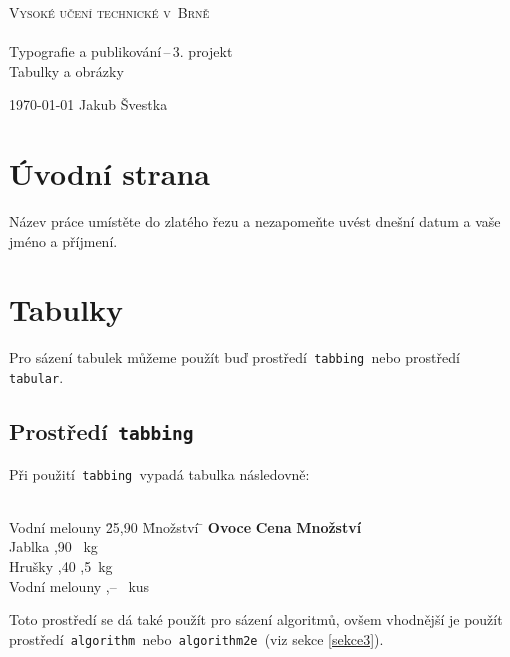 \documentclass[a4paper,11pt]{article}
\begin{document}
\begin{titlepage}
\begin{center}
\fontsize{27.1}{20}\selectfont\textsc{{Vysoké učení technické v~Brně}}\\
\fontsize{22.7}{0}\textsc{\selectfont{Fakulta informačních technologií}}\\
\LARGE{Typografie a publikování\,--\,3. projekt}\\
\Huge{Tabulky a obrázky}
\end{center}

{\hspace*{-0.6cm}\Large \today \hfill
Jakub Švestka}

\end{titlepage}

\newpage
\pagestyle{plain}

\section{Úvodní strana}
Název práce umístěte do zlatého řezu a nezapomeňte uvést dnešní datum a vaše jméno a příjmení.

\section{Tabulky}
Pro sázení tabulek můžeme použít buď prostředí\texttt{ tabbing }nebo prostředí\texttt{ tabular}.

\subsection{Prostředí\texttt{ tabbing}}
Při použití\texttt{ tabbing }vypadá tabulka následovně:
\begin{tabbing}\\[-0.55cm]

Vodní melouny \quad \= 25,90 \quad \= Množství \= \kill
\textbf{Ovoce} \> \textbf{Cena} \> \textbf{Množství}\\
Jablka ,90 \ kg\\
Hrušky ,40 ,5\ kg\\
Vodní melouny ,-- \ kus\\
\end{tabbing}

\noindent Toto prostředí se dá také použít pro sázení algoritmů, ovšem vhodnější je použít prostředí\texttt{ algorithm }nebo\texttt{ algorithm2e }(viz sekce \ref{sekce3}).
\end{document}
